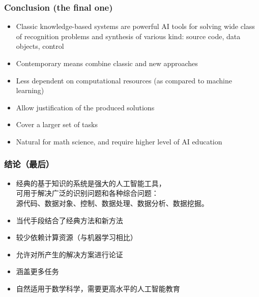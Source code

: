 \documentclass[10pt]{beamer}
\begin{document}
 \begin{frame}
   \frametitle{Conclusion (the final one)}
   \begin{itemize}
   \item Classic knowledge-based systems are powerful AI tools for solving wide class of recognition problems and synthesis of various kind: source code, data objects, control
   \item Contemporary means combine classic and new approaches
   \item Less dependent on computational resources (as compared to machine learning)
   \item Allow justification of the produced solutions
   \item Cover a larger set of tasks
   \item Natural for math science, and require higher level of AI education
   \end{itemize}
 \end{frame}

 \begin{frame}
   \frametitle{结论（最后）}
   \begin{itemize}
   \item 经典的基于知识的系统是强大的人工智能工具，\\
     可用于解决广泛的识别问题和各种综合问题：\\
     源代码、数据对象、控制、数据处理、数据分析、数据挖掘。
   \item 当代手段结合了经典方法和新方法
   \item 较少依赖计算资源（与机器学习相比）
   \item 允许对所产生的解决方案进行论证
   \item 涵盖更多任务
   \item 自然适用于数学科学，需要更高水平的人工智能教育
   \end{itemize}
 \end{frame}


\end{document}
